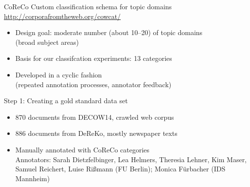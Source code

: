 \documentclass{beamer}
\begin{document}
\begin{frame}
  {CoReCo}
%
    Custom classification schema for topic domains\\
    \footnotesize{\url{http://corporafromtheweb.org/cowcat/}}

    \begin{itemize}
    \item Design goal: moderate number (about 10--20) of topic domains\\
    (broad subject areas)
    \item Basis for our classifcation experiments: 13 categories
    \item Developed in a cyclic fashion\\
    (repeated annotation processes, annotator feedback)
  \end{itemize}
\end{frame}

\begin{frame}
  {Step 1: Creating a gold standard data set}
  \begin{itemize}
    \item 870 documents from \alert{DECOW14}, crawled \alert{web} corpus\\
    \citep{SchaeferBildhauer2012a,Schaefer2015b}
    \item 886 documents from \alert{DeReKo}, mostly \alert{newspaper} texts\\
    \citep{KupietzEa2010}
    \item Manually annotated with CoReCo categories\\
      \vspace{0.5cm}
    {\footnotesize Annotators: Sarah Dietzfelbinger, Lea Helmers, Theresia Lehner, Kim Maser, Samuel Reichert, Luise Rißmann (FU Berlin); Monica Fürbacher (IDS Mannheim)}
  \end{itemize}
\end{frame}
\end{document}
